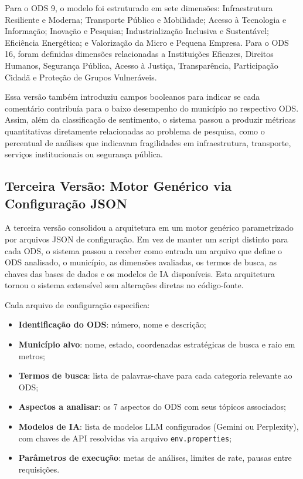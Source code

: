 Para o ODS 9, o modelo foi estruturado em sete dimensões: Infraestrutura Resiliente e Moderna; Transporte Público e Mobilidade; Acesso à Tecnologia e Informação; Inovação e Pesquisa; Industrialização Inclusiva e Sustentável; Eficiência Energética; e Valorização da Micro e Pequena Empresa. Para o ODS 16, foram definidas dimensões relacionadas a Instituições Eficazes, Direitos Humanos, Segurança Pública, Acesso à Justiça, Transparência, Participação Cidadã e Proteção de Grupos Vulneráveis.

Essa versão também introduziu campos booleanos para indicar se cada comentário contribuía para o baixo desempenho do município no respectivo ODS. Assim, além da classificação de sentimento, o sistema passou a produzir métricas quantitativas diretamente relacionadas ao problema de pesquisa, como o percentual de análises que indicavam fragilidades em infraestrutura, transporte, serviços institucionais ou segurança pública.

\subsection{Terceira Versão: Motor Genérico via Configuração JSON}
\label{subsec:v3}

A terceira versão consolidou a arquitetura em um motor genérico parametrizado por arquivos JSON de configuração. Em vez de manter um script distinto para cada ODS, o sistema passou a receber como entrada um arquivo que define o ODS analisado, o município, as dimensões avaliadas, os termos de busca, as chaves das bases de dados e os modelos de IA disponíveis. Esta arquitetura tornou o sistema extensível sem alterações diretas no código-fonte.

Cada arquivo de configuração especifica:

\begin{itemize}
    \item \textbf{Identificação do ODS}: número, nome e descrição;
    \item \textbf{Município alvo}: nome, estado, coordenadas estratégicas de busca e raio em metros;
    \item \textbf{Termos de busca}: lista de palavras-chave para cada categoria relevante ao ODS;
    \item \textbf{Aspectos a analisar}: os 7 aspectos do ODS com seus tópicos associados;
    \item \textbf{Modelos de IA}: lista de modelos LLM configurados (Gemini ou Perplexity), com chaves de API resolvidas via arquivo \texttt{env.properties};
    \item \textbf{Parâmetros de execução}: metas de análises, limites de rate, pausas entre requisições.
\end{itemize}

